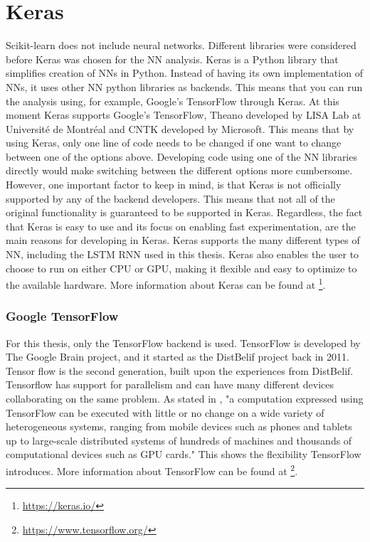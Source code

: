 \section{Keras}
    Scikit-learn does not include neural networks. Different libraries were considered before Keras was chosen for the NN analysis. Keras \cite{chollet2015keras} is a Python library that simplifies creation of NNs in Python. Instead of having its own implementation of NNs, it uses other NN python libraries as backends. This means that you can run the analysis using, for example, Google's TensorFlow through Keras. At this moment Keras supports Google's TensorFlow, Theano developed by LISA Lab at Université de Montréal and CNTK developed by Microsoft. This means that by using Keras, only one line of code needs to be changed if one want to change between one of the options above. Developing code using one of the NN libraries directly would make switching between the different options more cumbersome. However, one important factor to keep in mind, is that Keras is not officially supported by any of the backend developers. This means that  not all of the original functionality is guaranteed to be supported in Keras. Regardless, the fact that Keras is easy to use and its focus on enabling fast experimentation, are the main reasons for developing in Keras. Keras supports the many different types of NN, including the LSTM RNN used in this thesis. Keras also enables the user to choose to run on either CPU or GPU, making it flexible and easy to optimize to the available hardware. More information about Keras can be found at \footnote{\url{https://keras.io/}}.
        
    \subsubsection{Google TensorFlow}
        For this thesis, only the TensorFlow backend is used. TensorFlow \cite{Abadi} is developed by The Google Brain project, and it started as the DistBelif project back in 2011. Tensor flow is the second generation, built upon the experiences from DistBelif. Tensorflow has support for parallelism and can have many different devices collaborating on the same problem. As stated in \cite{Abadi}, "a computation expressed using TensorFlow can be executed with little or no change on a wide variety of heterogeneous systems, ranging from mobile devices such as phones and tablets up to large-scale distributed systems of hundreds of machines and thousands of computational devices such as GPU cards." This shows the flexibility TensorFlow introduces. More information about TensorFlow can be found at \footnote{\url{https://www.tensorflow.org/}}.
    
    
    